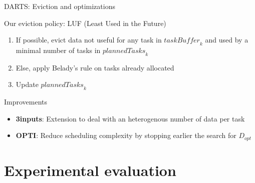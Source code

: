 \documentclass{libs/ufc_format}
\newcommand{\threeinputs}{\textbf{3inputs}\xspace}
\newcommand{\OPTI}{\textbf{OPTI}\xspace}
\newcommand{\GPU}[1]{\ensuremath{\mathrm{GPU}_{#1}}\xspace}
\newcommand{\plannedTasks}[1]{\ensuremath{\mathit{plannedTasks}_{#1}}\xspace}
\newcommand{\pulledTasks}[1]{\ensuremath{\mathit{taskBuffer}_{#1}}\xspace}
\begin{document}
\begin{frame}{DARTS: Eviction and optimizations}
	\begin{alertblock}{Our eviction policy: LUF (Least Used in the Future)}
		\begin{enumerate}
			\item If possible, evict data not useful for any task in $\pulledTasks{k}$ and used by a minimal number of tasks in $\plannedTasks{k}$
			\item Else, apply Belady's rule on tasks already allocated
			\item Update $\plannedTasks{k}$
		\end{enumerate}
	\end{alertblock}
	\begin{alertblock}{Improvements}
		\begin{itemize}
			\item \threeinputs: Extension to deal with an heterogenous number of data per task
			\item \OPTI: Reduce scheduling complexity by stopping earlier the search for $D_{opt}$
		\end{itemize}
	\end{alertblock}
\end{frame}

\section{Experimental evaluation}
\end{document}
